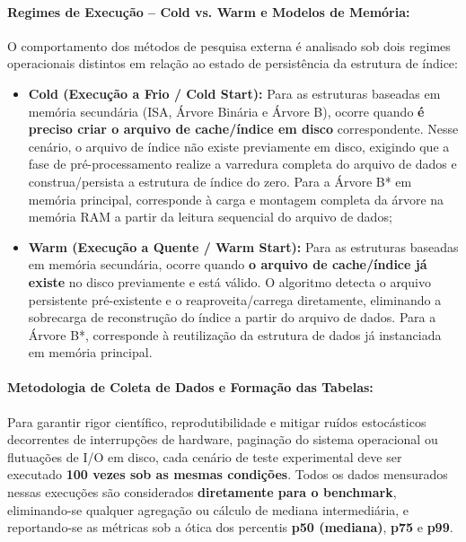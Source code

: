 \documentclass[12pt,a4paper]{article}
\begin{document}
\paragraph{Regimes de Execução -- Cold vs. Warm e Modelos de Memória:}
O comportamento dos métodos de pesquisa externa é analisado sob dois regimes operacionais distintos em relação ao estado de persistência da estrutura de índice:
\begin{itemize}
    \item \textbf{Cold (Execução a Frio / Cold Start):} Para as estruturas baseadas em memória secundária (ISA, Árvore Binária e Árvore B), ocorre quando \textbf{é preciso criar o arquivo de cache/índice em disco} correspondente. Nesse cenário, o arquivo de índice não existe previamente em disco, exigindo que a fase de pré-processamento realize a varredura completa do arquivo de dados e construa/persista a estrutura de índice do zero. Para a Árvore B* em memória principal, corresponde à carga e montagem completa da árvore na memória RAM a partir da leitura sequencial do arquivo de dados;
    \item \textbf{Warm (Execução a Quente / Warm Start):} Para as estruturas baseadas em memória secundária, ocorre quando \textbf{o arquivo de cache/índice já existe} no disco previamente e está válido. O algoritmo detecta o arquivo persistente pré-existente e o reaproveita/carrega diretamente, eliminando a sobrecarga de reconstrução do índice a partir do arquivo de dados. Para a Árvore B*, corresponde à reutilização da estrutura de dados já instanciada em memória principal.
\end{itemize}

\paragraph{Metodologia de Coleta de Dados e Formação das Tabelas:}
Para garantir rigor científico, reprodutibilidade e mitigar ruídos estocásticos decorrentes de interrupções de hardware, paginação do sistema operacional ou flutuações de I/O em disco, cada cenário de teste experimental deve ser executado \textbf{100 vezes sob as mesmas condições}. Todos os dados mensurados nessas execuções são considerados \textbf{diretamente para o benchmark}, eliminando-se qualquer agregação ou cálculo de mediana intermediária, e reportando-se as métricas sob a ótica dos percentis \textbf{p50 (mediana)}, \textbf{p75} e \textbf{p99}.
\end{document}
